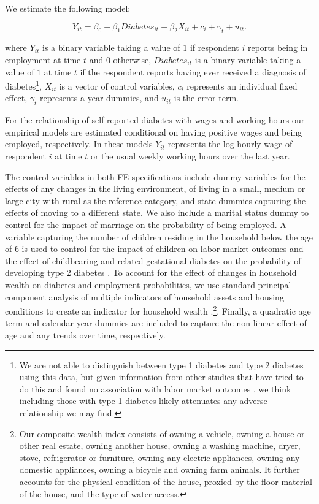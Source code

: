 \documentclass[12pt,english]{article}
\begin{document}
{We estimate the following model:

\noindent 
\begin{equation}
Y_{it}=\beta_{0}+\beta_{1}Diabetes_{it}+\beta_{2}X_{it}+c_{i}+\gamma_{t}+u_{it}.\label{eq:employed}
\end{equation}


where $Y_{it}$ is a binary variable taking a value of $1$ if respondent $i$ reports being in employment at time $t$ and $0$ otherwise, $Diabetes_{it}$ is a binary variable taking a value of $1$ at time $t$ if the respondent reports having ever received a diagnosis of diabetes\footnote{We are not able to distinguish between type 1 diabetes and type 2 diabetes using this data, but given information from other studies that have tried to do this and found no association with labor market outcomes \parencite{Minor2010,Minor2015}, we think including those with type 1 diabetes likely attenuates any adverse relationship we may find.}, $X_{it}$ is a vector of control variables, $c_{i}$ represents an individual fixed effect, $\gamma_{t}$ represents a year dummies, and $u_{it}$ is the error term.

For the relationship of self-reported diabetes with wages and working hours our empirical models are estimated conditional on having positive wages and being employed, respectively. In these models $Y_{it}$ represents the log hourly wage of respondent $i$ at time $t$ or the usual weekly working hours over the last year.

The control variables in both \ac{FE} specifications include dummy variables for the effects of any changes in the living environment,
of living in a small, medium or large city with rural as the reference category, and state dummies capturing the effects of moving to a different state. We also include a marital status dummy to control for the impact of marriage on the probability of being employed.
A variable capturing the number of children residing in the household below the age of 6 is used to control for the impact of children
on labor market outcomes and the effect of childbearing and related gestational diabetes on the probability of developing type 2 diabetes
\parencite{Bellamy2009}. To account for the effect of changes in household wealth on diabetes and employment probabilities, we use standard
principal component analysis of multiple indicators of household assets and housing conditions to create an indicator for household wealth
\parencite{Filmer2001}.\footnote{Our composite wealth index consists of owning a vehicle, owning a house or other real estate, owning another house, owning a washing machine, dryer, stove, refrigerator or furniture, owning any electric appliances, owning any domestic appliances, owning a bicycle and owning farm animals. It further accounts for the physical condition of the house, proxied by the floor material of the house, and the type of water access.}. Finally, a quadratic age term and calendar year dummies are included to capture the non-linear effect of age and any trends over time, respectively.

}
\end{document}
